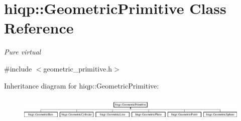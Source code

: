 \hypertarget{classhiqp_1_1GeometricPrimitive}{\section{hiqp\-:\-:Geometric\-Primitive Class Reference}
\label{classhiqp_1_1GeometricPrimitive}
}


{\itshape Pure virtual}  




{\ttfamily \#include $<$geometric\-\_\-primitive.\-h$>$}

Inheritance diagram for hiqp\-:\-:Geometric\-Primitive\-:\begin{figure}[H]
\begin{center}
\leavevmode
\includegraphics[height=1.212121cm]{classhiqp_1_1GeometricPrimitive}
\end{center}
\end{figure}
